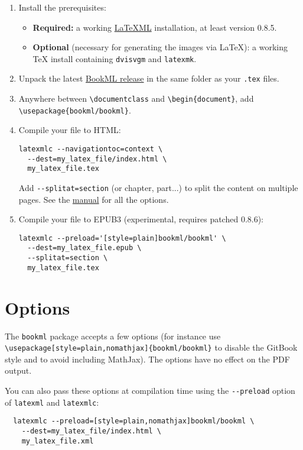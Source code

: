 \documentclass[a4paper,british]{article}
\def\ltxinline{\lstinline[style=bookml]}
\begin{document}
\begin{enumerate}
  \item Install the prerequisites:
  \begin{itemize}
    \item \textbf{Required:} a working \href{https://dlmf.nist.gov/LaTeXML/}{LaTeXML} installation, at least version 0.8.5.
    \item \textbf{Optional} (necessary for generating the images via \LaTeX): a working \TeX{} install containing \lstinline[frame=none]|dvisvgm| and \lstinline[frame=none]|latexmk|.
  \end{itemize}
  \item Unpack the latest \href{https://github.com/vlmantova/bookml/releases}{BookML release} in the same folder as your \lstinline[frame=none]|.tex| files.
  \item Anywhere between \ltxinline|\documentclass| and \ltxinline|\begin{document}|, add \ltxinline|\usepackage{bookml/bookml}|.
  \item Compile your file to HTML:
    \begin{lstlisting}
latexmlc --navigationtoc=context \
  --dest=my_latex_file/index.html \
  my_latex_file.tex
    \end{lstlisting}
    Add \ltxinline|--splitat=section| (or chapter, part...) to split the content on multiple pages. See the \LaTeXML{} \href{https://dlmf.nist.gov/LaTeXML/manual/usage/}{manual} for all the options.
  \item Compile your file to EPUB3 (experimental, requires patched \LaTeXML{} 0.8.6):
    \begin{lstlisting}
latexmlc --preload='[style=plain]bookml/bookml' \
  --dest=my_latex_file.epub \
  --splitat=section \
  my_latex_file.tex
    \end{lstlisting}
\end{enumerate}

\section{Options}

The \ltxinline|bookml| package accepts a few options (for instance use \ltxinline|\usepackage[style=plain,nomathjax]{bookml/bookml}| to disable the GitBook style and to avoid including MathJax). The options have no effect on the PDF output.

You can also pass these options at compilation time using the \ltxinline|--preload| option of \ltxinline|latexml| and \ltxinline|latexmlc|:
\begin{lstlisting}
  latexmlc --preload=[style=plain,nomathjax]bookml/bookml \
    --dest=my_latex_file/index.html \
    my_latex_file.xml
\end{lstlisting}
\end{document}
